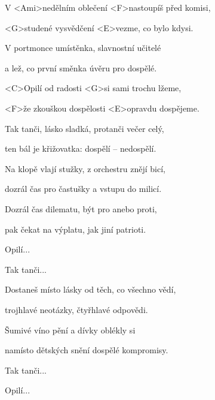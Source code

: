 

\zs
V <Ami>nedělním oblečení <F>nastoupíš před komisi,

<G>studené vysvědčení <E>vezme, co bylo kdysi.
\ks

\zs
V portmonce umístěnka, slavnostní učitelé

a lež, co první směnka úvěru pro dospělé.
\ks

\zr
<C>Opilí od radosti <G>si sami trochu lžeme,

<F>že zkouškou dospělosti <E>opravdu dospějeme.
\kr

\zr
Tak tanči, lásko sladká, protanči večer celý,

ten bál je křižovatka: dospělí -- nedospělí.
\kr

\zs
Na klopě vlají stužky, z orchestru znějí bicí,

dozrál čas pro častušky a vstupu do milicí.
\ks

\zs
Dozrál čas dilematu, být pro anebo proti,

pak čekat na výplatu, jak jiní patrioti.
\ks

\zr Opilí... \kr

\zr Tak tanči... \kr

\zs
Dostaneš místo lásky od těch, co všechno vědí,

trojhlavé neotázky, čtyřhlavé odpovědi.
\ks

\zr
Šumivé víno pění a dívky oblékly si

namísto dětských snění dospělé kompromisy.
\kr

\zr Tak tanči... \kr

\zr Opilí... \kr

\kp
